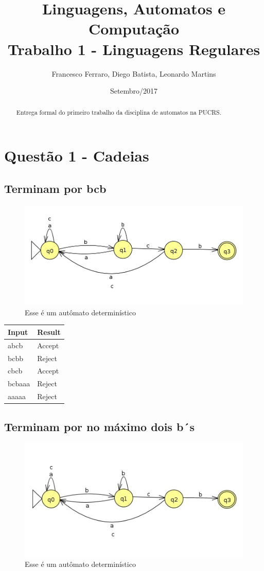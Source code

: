 \documentclass[11pt]{article}
\author{Francesco Ferraro, Diego Batista, Leonardo Martins}
\date{Setembro/2017}
\title{Linguagens, Automatos e Computação\\\medskip
\large Trabalho 1 - Linguagens Regulares}
\begin{document}
\maketitle
\begin{abstract}
Entrega formal do primeiro trabalho da disciplina de automatos na PUCRS.
\end{abstract}

\section{Questão 1 - Cadeias}
\label{sec:org6854e37}
\subsection{Terminam por bcb}
\label{sec:orgce1b984}
\begin{figure}[htbp]
\centering
\includegraphics[width=.9\linewidth]{./q1/a/q1a.jpg}
\caption{\label{fig:org666ee09}
Esse é um autômato determinístico}
\end{figure}

\begin{center}
\begin{tabular}{ll}
Input & Result\\
\hline
abcb & Accept\\
bcbb & Reject\\
cbcb & Accept\\
bcbaaa & Reject\\
aaaaa & Reject\\
\end{tabular}
\end{center}

\subsection{Terminam por no máximo dois b´s}
\label{sec:orge75716f}
\begin{figure}[htbp]
\centering
\includegraphics[width=.9\linewidth]{./q1/b/q1b.jpg}
\caption{\label{fig:orga8a9744}
Esse é um autômato determinístico}
\end{figure}
\end{document}
